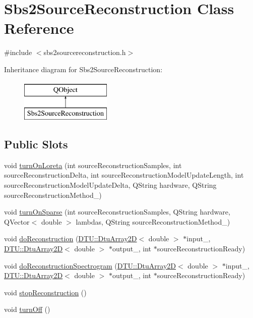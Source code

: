 \hypertarget{classSbs2SourceReconstruction}{\section{Sbs2\-Source\-Reconstruction Class Reference}
\label{classSbs2SourceReconstruction}
}


{\ttfamily \#include $<$sbs2sourcereconstruction.\-h$>$}

Inheritance diagram for Sbs2\-Source\-Reconstruction\-:\begin{figure}[H]
\begin{center}
\leavevmode
\includegraphics[height=2.000000cm]{classSbs2SourceReconstruction}
\end{center}
\end{figure}
\subsection*{Public Slots}
\begin{DoxyCompactItemize}
\item 
void \hyperlink{classSbs2SourceReconstruction_ae90a564e34f7973833de68151f8b03da}{turn\-On\-Loreta} (int source\-Reconstruction\-Samples, int source\-Reconstruction\-Delta, int source\-Reconstruction\-Model\-Update\-Length, int source\-Reconstruction\-Model\-Update\-Delta, Q\-String hardware, Q\-String source\-Reconstruction\-Method\-\_\-)
\item 
void \hyperlink{classSbs2SourceReconstruction_a63fffbdc6b14d6a3e1cb9f0a643f01b6}{turn\-On\-Sparse} (int source\-Reconstruction\-Samples, Q\-String hardware, Q\-Vector$<$ double $>$ lambdas, Q\-String source\-Reconstruction\-Method\-\_\-)
\item 
void \hyperlink{classSbs2SourceReconstruction_a6d812bfa61990f912e8d9a1b2346c030}{do\-Reconstruction} (\hyperlink{classDTU_1_1DtuArray2D}{D\-T\-U\-::\-Dtu\-Array2\-D}$<$ double $>$ $\ast$input\-\_\-, \hyperlink{classDTU_1_1DtuArray2D}{D\-T\-U\-::\-Dtu\-Array2\-D}$<$ double $>$ $\ast$output\-\_\-, int $\ast$source\-Reconstruction\-Ready)
\item 
void \hyperlink{classSbs2SourceReconstruction_af198fd9e278757ab86c3542c4e1eaca4}{do\-Reconstruction\-Spectrogram} (\hyperlink{classDTU_1_1DtuArray2D}{D\-T\-U\-::\-Dtu\-Array2\-D}$<$ double $>$ $\ast$input\-\_\-, \hyperlink{classDTU_1_1DtuArray2D}{D\-T\-U\-::\-Dtu\-Array2\-D}$<$ double $>$ $\ast$output\-\_\-, int $\ast$source\-Reconstruction\-Ready)
\item 
void \hyperlink{classSbs2SourceReconstruction_abf56fa85a9b63aa18592c2c4b84a2750}{stop\-Reconstruction} ()
\item 
void \hyperlink{classSbs2SourceReconstruction_a7456e6907f82ba461d9c4728f2bd8c40}{turn\-Off} ()
\end{DoxyCompactItemize}

